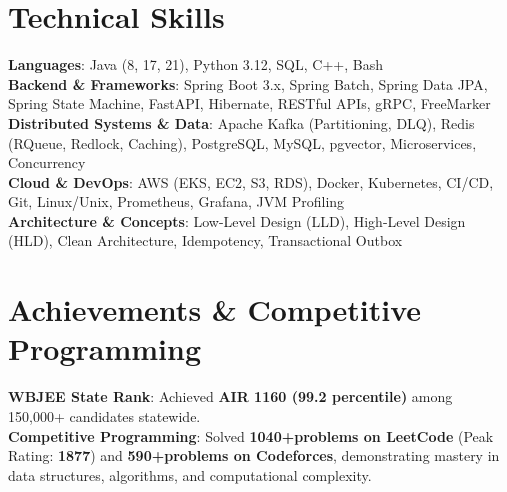 \documentclass[letterpaper,10.5pt]{article}
\begin{document}
\section{Technical Skills}
 \begin{itemize}[leftmargin=0.15in, label={}]
    \small{\item{
     \textbf{Languages}: Java (8, 17, 21), Python 3.12, SQL, C++, Bash \\
     \textbf{Backend \& Frameworks}: Spring Boot 3.x, Spring Batch, Spring Data JPA, Spring State Machine, FastAPI, Hibernate, RESTful APIs, gRPC, FreeMarker \\
     \textbf{Distributed Systems \& Data}: Apache Kafka (Partitioning, DLQ), Redis (RQueue, Redlock, Caching), PostgreSQL, MySQL, pgvector, Microservices, Concurrency \\
     \textbf{Cloud \& DevOps}: AWS (EKS, EC2, S3, RDS), Docker, Kubernetes, CI/CD, Git, Linux/Unix, Prometheus, Grafana, JVM Profiling \\
     \textbf{Architecture \& Concepts}: Low-Level Design (LLD), High-Level Design (HLD), Clean Architecture, Idempotency, Transactional Outbox
    }}
 \end{itemize}

\section{Achievements \& Competitive Programming}
 \begin{itemize}[leftmargin=0.15in, label={}]
    \small{\item{
     \textbf{WBJEE State Rank}: Achieved \textbf{AIR 1160 (99.2 percentile)} among 150,000+ candidates statewide. \\
     \textbf{Competitive Programming}: Solved \textbf{1040+\text{~}problems on LeetCode} (Peak Rating: \textbf{1877}) and \textbf{590+\text{~}problems on Codeforces}, demonstrating mastery in data structures, algorithms, and computational complexity.
    }}
 \end{itemize}
\end{document}
